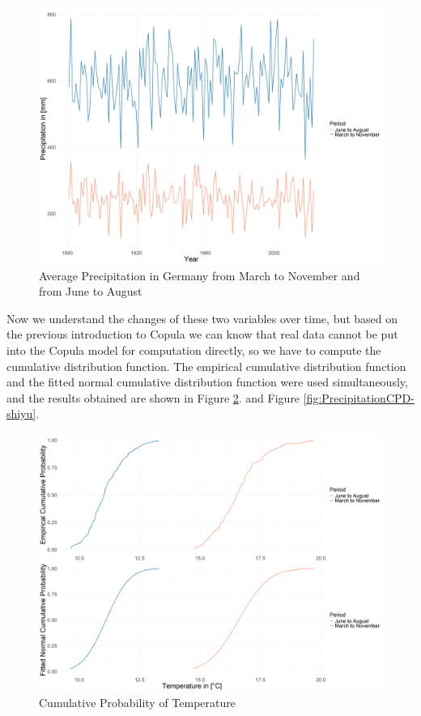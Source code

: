 \documentclass[
]{krantz}
\begin{document}
\begin{figure}

{\centering \includegraphics[width=0.7\linewidth]{work/03-compounds/figures/Precipitation/Average/Precipitation} 

}

\caption{Average Precipitation in Germany from March to November and from June to August}\label{fig:AveragePrecipitation-shiyu}
\end{figure}

Now we understand the changes of these two variables over time, but based on the previous introduction to Copula we can know that real data cannot be put into the Copula model for computation directly, so we have to compute the cumulative distribution function. The empirical cumulative distribution function and the fitted normal cumulative distribution function were used simultaneously, and the results obtained are shown in Figure \ref{fig:TemperatureCPD-shiyu}. and Figure \ref{fig:PrecipitationCPD-shiyu}.

\begin{figure}

{\centering \includegraphics[width=0.65\linewidth]{work/03-compounds/figures/Temperature/Average/TemperatureCPD} 

}

\caption{Cumulative Probability of Temperature}\label{fig:TemperatureCPD-shiyu}
\end{figure}
\end{document}
